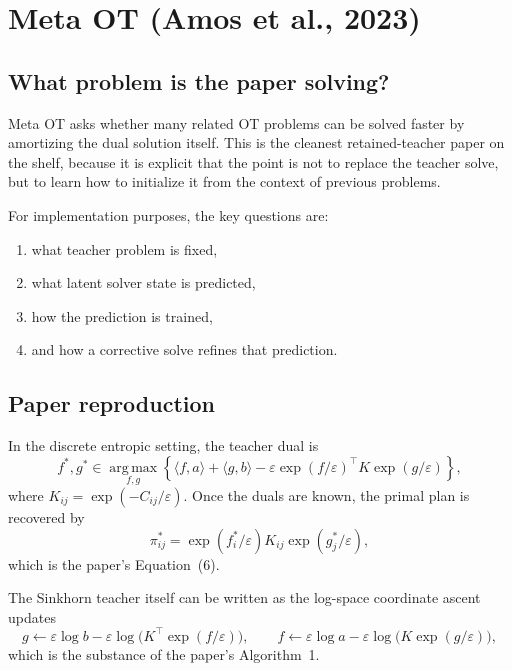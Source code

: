 \documentclass[11pt]{report}
\newcommand{\argmax}{\operatorname*{arg\,max}}
\begin{document}
\section{Meta OT (Amos et al., 2023)}

\subsection*{What problem is the paper solving?}

Meta OT asks whether many related OT problems can be solved faster by amortizing
the dual solution itself.  This is the cleanest retained-teacher paper on the
shelf, because it is explicit that the point is not to replace the teacher solve,
but to learn how to initialize it from the context of previous problems.

For implementation purposes, the key questions are:
\begin{enumerate}[label=(\roman*)]
  \item what teacher problem is fixed,
  \item what latent solver state is predicted,
  \item how the prediction is trained,
  \item and how a corrective solve refines that prediction.
\end{enumerate}

\subsection*{Paper reproduction}

In the discrete entropic setting, the teacher dual is
\begin{equation}
f^*,g^* \in
\argmax_{f,g}
\left\{
\langle f,a\rangle + \langle g,b\rangle
-\varepsilon \exp(f/\varepsilon)^{\top} K \exp(g/\varepsilon)
\right\},
\label{eq:metaot-entropic-dual}
\end{equation}
where $K_{ij}=\exp(-C_{ij}/\varepsilon)$.  Once the duals are known, the primal
plan is recovered by
\begin{equation}
\pi^*_{ij} = \exp(f_i^*/\varepsilon)K_{ij}\exp(g_j^*/\varepsilon),
\label{eq:metaot-primal-recovery}
\end{equation}
which is the paper's Equation~(6).

The Sinkhorn teacher itself can be written as the log-space coordinate ascent
updates
\begin{equation}
g \leftarrow \varepsilon \log b - \varepsilon \log\bigl(K^{\top}\exp(f/\varepsilon)\bigr),
\qquad
f \leftarrow \varepsilon \log a - \varepsilon \log\bigl(K\exp(g/\varepsilon)\bigr),
\label{eq:metaot-sinkhorn-updates}
\end{equation}
which is the substance of the paper's Algorithm~1.
\end{document}
